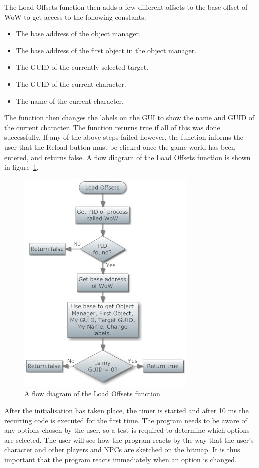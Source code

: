 The Load Offsets function then adds a few different offsets to the base offset of WoW to get access to the following constants:
\begin{itemize}
	\item The base address of the object manager.
	\item The base address of the first object in the object manager.
	\item The GUID of the currently selected target.
	\item The GUID of the current character.
	\item The name of the current character.
\end{itemize}

The function then changes the labels on the GUI to show the name and GUID of the current character. The function returns true if all of this was done successfully. If any of the above steps failed however, the function informs the user that the Reload button must be clicked once the game world has been entered, and returns false. A flow diagram of the Load Offsets function is shown in figure~\ref{loadoff}.

\begin{figure}[htbp]  %
\centering
\includegraphics[scale = 0.65]{loadoff.jpg}	
\caption{A flow diagram of the Load Offsets function}
\label{loadoff}
\end{figure}

After the initialisation has taken place, the timer is started and after 10 ms the recurring code is executed for the first time. The program needs to be aware of any options chosen by the user, so a test is required to determine which options are selected. The user will see how the program reacts by the way that the user's character and other players and NPCs are sketched on the bitmap. It is thus important that the program reacts immediately when an option is changed.

